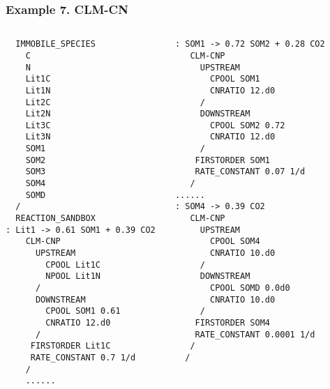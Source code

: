 \documentclass{beamer}
\begin{document}
\begin{frame}[fragile]
\frametitle{Example 7. CLM-CN}

\tiny
\begin{columns}
\column{1.5in}
\begin{verbatim}
  IMMOBILE_SPECIES
    C
    N
    Lit1C
    Lit1N
    Lit2C
    Lit2N
    Lit3C
    Lit3N
    SOM1
    SOM2
    SOM3
    SOM4
    SOMD
  /
  REACTION_SANDBOX
: Lit1 -> 0.61 SOM1 + 0.39 CO2 
    CLM-CNP
      UPSTREAM
        CPOOL Lit1C
        NPOOL Lit1N
      /
      DOWNSTREAM
        CPOOL SOM1 0.61
        CNRATIO 12.d0
      /
     FIRSTORDER Lit1C
     RATE_CONSTANT 0.7 1/d 
    /
    ......
\end{verbatim}  
\column{1.5in}
\begin{verbatim}   
: SOM1 -> 0.72 SOM2 + 0.28 CO2 
   CLM-CNP
     UPSTREAM
       CPOOL SOM1
       CNRATIO 12.d0
     /
     DOWNSTREAM
       CPOOL SOM2 0.72
       CNRATIO 12.d0
     /
    FIRSTORDER SOM1
    RATE_CONSTANT 0.07 1/d 
   /
......
: SOM4 -> 0.39 CO2 
   CLM-CNP
     UPSTREAM
       CPOOL SOM4
       CNRATIO 10.d0
     /
     DOWNSTREAM
       CPOOL SOMD 0.0d0
       CNRATIO 10.d0
     /
    FIRSTORDER SOM4
    RATE_CONSTANT 0.0001 1/d 
   /
  /
\end{verbatim}  
\end{columns}
\end{frame}
\end{document}
